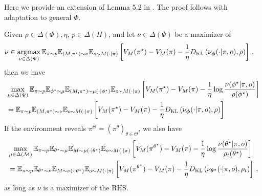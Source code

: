 Here we provide an extension of Lemma 5.2 in \cite{xu2023bayesian}. The proof follows \cite{xu2023bayesian} with adaptation to general $\Phi$.

\begin{lemma}
Given $\rho \in \Delta(\Phi), \eta$, $p \in \Delta(\Pi)$, and let $\nu \in \Delta(\Psi)$ be a maximizer of
\begin{align*}
    &\nu \in \argmax_{\nu \in \Delta(\Psi)}\E_{\pi\sim p} \E_{(M,\pi^\star)\sim \nu} \E_{o\sim M(\cdot|\pi)}\left[ V_{M}(\pi^\star) -  V_{M}(\pi) - \frac{1}{\eta} \KL\left( \nu_{\bo{\phi}}(\cdot|\pi, o), \rho\right) \right]\,,
\end{align*}
then we have
\begin{align*}
    &\max_{\mu \in \Delta(\Psi)}\E_{\pi\sim p}\E_{\phi^\star \sim \mu}\E_{(M, \pi^\star) \sim \mu(\cdot|\phi^\star)} \E_{o\sim M(\cdot|\pi)}\left[ V_{M}(\pi^\star) -  V_{M}(\pi) - \frac{1}{\eta} \log\frac{\nu(\phi^\star|\pi, o)}{\rho(\phi^\star)} \right]\\
       &= \E_{\pi\sim p} \E_{(M,\pi^\star)\sim \nu} \E_{o\sim M(\cdot|\pi)}\left[ V_{M}(\pi^\star) -  V_{M}(\pi) - \frac{1}{\eta} \KL\left( \nu_{\bo{\phi}}(\cdot|\pi, o), \rho\right) \right]
\end{align*}
If the environment reveals $\pi^{\Theta} =(\pi^\theta)_{\theta\in\Theta}$, we also have
\begin{align*}
    &\max_{\mu \in \Delta(\calM)}\E_{\pi \sim p}\E_{\theta^\star \sim \mu}\E_{M\sim \mu(\cdot|\theta^\star)} \E_{o\sim M(\cdot|\pi)}\left[ V_{M}(\pi^{\theta^\star}) -  V_{M}(\pi) - \frac{1}{\eta} \log\frac{\nu(\theta^\star|\pi, o)}{\rho_t(\theta^\star)} \right]
    \\&= \E_{\pi\sim p} \E_{\theta^\star \sim \nu} \E_{M \sim \nu(\cdot|\theta^\star)} \E_{o\sim M(\cdot|\pi)}\left[ V_{M}(\pi^{\theta^\star}) -  V_{M}(\pi) -  \frac{1}{\eta} \KL\left( \nu_{\bo{\theta^\star}}(\cdot|\pi, o), \rho_t\right)\right]\,,
\end{align*}
as long as $\nu$ is a maximizer of the RHS.
\label{lem: max posterior}
\end{lemma}

